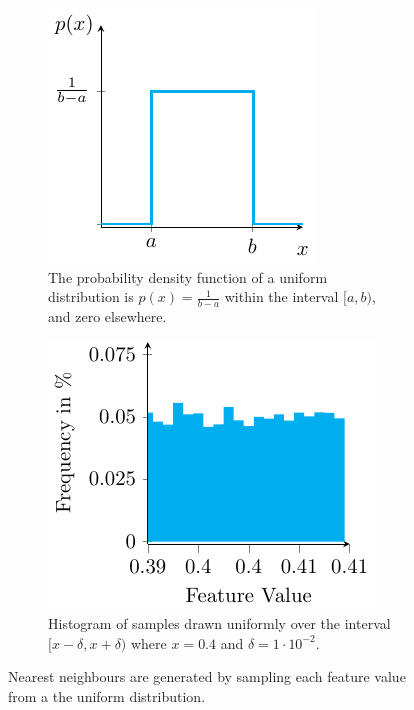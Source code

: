  \begin{figure}
    \centering
    \begin{subfigure}[b]{0.45\textwidth}
        \centering
        \includegraphics[width=\textwidth]{tikz/uniform_distribution.pdf}
        \caption{The probability density function of a uniform distribution is $p(x) = \frac{1}{b-a}$ within the interval $[a, b)$, and zero elsewhere.}
        \label{subfig:uniform_dist}
    \end{subfigure}
    \hfill
    \begin{subfigure}[b]{0.45\textwidth}
        \centering
        \includegraphics[width=\textwidth]{tikz/histogram_nearest_neighbour.pdf}
        \caption{Histogram of  samples drawn uniformly over the interval $[x-\delta, x+\delta)$ where $x=0.4$ and $\delta=1 \cdot 10^{-2}$.}
        \label{subfig:hist_nn}
    \end{subfigure}
    \caption{Nearest neighbours are generated by sampling each feature value from a the uniform distribution.}
    \label{fig:uniform_dist_nn}
\end{figure}

